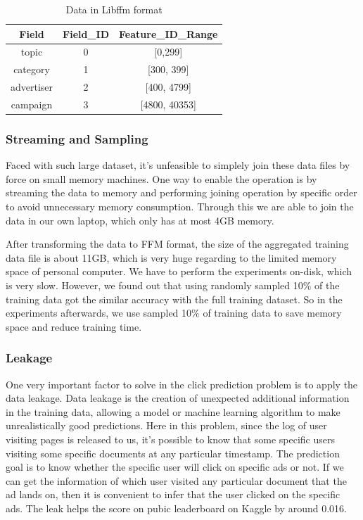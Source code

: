 \documentclass[fleqn,10pt]{SelfArx} %
\begin{document}
\begin{table}[!htbp]
\begin{center}
  \begin{tabular}{ c|c|c }\hline
  Field         &     Field\_ID    &     Feature\_ID\_Range \\ \hline \hline
  topic         &        0             &     [0,299] \\
  category   &        1             &     [300, 399] \\
  advertiser &        2              &    [400, 4799] \\
  campaign  &        3              &    [4800, 40353]\\ \hline \hline
  \end{tabular}
\end{center}
\caption{Data in Libffm format}\label{tab:ffm}
\end{table}

\subsubsection{Streaming and Sampling}
Faced with such large dataset, it's unfeasible to simplely join these data files by force on small memory machines. One way to enable the operation is by streaming the data to memory and performing joining operation by specific order to avoid unnecessary memory consumption. Through this we are able to join the data in our own laptop, which only has at most 4GB memory.

After transforming the data to FFM format, the size of the aggregated training data file is about 11GB, which is very huge regarding to the limited memory space of personal computer. We have to perform the experiments on-disk, which is very slow. However, we found out that using randomly sampled 10\% of the training data got the similar accuracy with the full training dataset. So in the experiments afterwards, we use sampled 10\% of training data to save memory space and reduce training time.

\subsubsection{Leakage}\label{leak}
One very important factor to solve in the click prediction problem is to apply the data leakage. Data leakage is the creation of unexpected additional information in the training data, allowing a model or machine learning algorithm to make unrealistically good predictions. Here in this problem, since the log of user visiting pages is released to us, it's possible to know that some specific users visiting some specific documents at any particular timestamp. The prediction goal is to know whether the specific user will click on specific ads or not. If we can get the information of which user visited any particular document that the ad lands on, then it is convenient to infer that the user clicked on the specific ads. The leak helps the score on pubic leaderboard on Kaggle by around 0.016.
\end{document}
